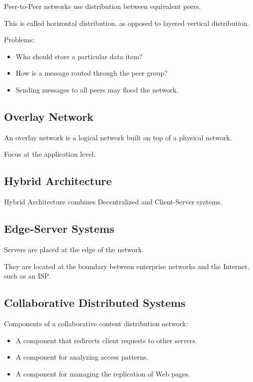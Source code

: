 \documentclass{article}
\begin{document}
Peer-to-Peer networks use distribution between equivalent peers.

This is called horizontal distribution, as opposed to layered vertical distribution.

Problems:

\begin{itemize}
    \item Who should store a particular data item?
    \item How is a message routed through the peer group?
    \item Sending messages to all peers may flood the network.
\end{itemize}

\subsection{Overlay Network}

An overlay network is a logical network built on top of a physical network.

Focus at the application level.

\subsection{Hybrid Architecture}

Hybrid Architecture combines Decentralized and Client-Server systems.

\subsection{Edge-Server Systems}

Servers are placed at the edge of the network.

They are located at the boundary between enterprise networks and the Internet, such as an ISP.

\subsection{Collaborative Distributed Systems}

Components of a collaborative content distribution network:

\begin{itemize}
    \item A component that redirects client requests to other servers.
    \item A component for analyzing access patterns.
    \item A component for managing the replication of Web pages.
\end{itemize}
\end{document}
